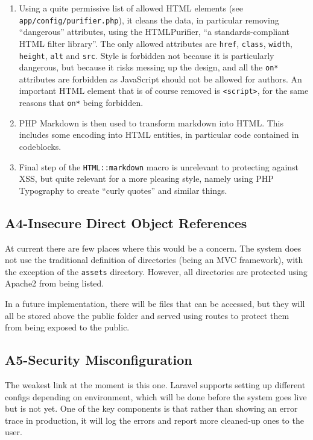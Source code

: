 \begin{enumerate}[1.]
\item
  Using a quite permissive list of allowed HTML elements (see \texttt{app/config/purifier.php}), it cleans the data, in particular removing ``dangerous'' attributes, using the HTMLPurifier, ``a standards-compliant HTML filter library''\citep{Purifier2013}. The only allowed attributes are \texttt{href}, \texttt{class}, \texttt{width}, \texttt{height}, \texttt{alt} and \texttt{src}. Style is forbidden not
  because it is particularly dangerous, but because it risks messing up the design, and all the \texttt{on*} attributes are forbidden as JavaScript should not be allowed for authors. An important HTML element that is of course removed is \texttt{\textless{}script\textgreater{}}, for the same reasons that \texttt{on*} being forbidden.
\item
  PHP Markdown is then used to transform markdown into HTML. This includes some encoding into HTML entities, in particular code contained in codeblocks.
\item
  Final step of the \texttt{HTML::markdown} macro is unrelevant to protecting against XSS, but quite relevant for a more pleasing style, namely using PHP Typography to create ``curly quotes'' and similar things.
\end{enumerate}

\subsection{A4-Insecure Direct Object References}
\noindent
At current there are few places where this would be a concern. The system does not use the traditional definition of directories (being an MVC framework), with the exception of the \texttt{assets} directory. However, all directories are protected using Apache2 from being listed.

In a future implementation, there will be files that can be accessed, but they will all be stored above the public folder and served using routes to protect them from being exposed to the public.

\subsection{A5-Security Misconfiguration}
\noindent
The weakest link at the moment is this one. Laravel supports setting up different configs depending on environment, which will be done before the system goes live but is not yet. One of the key components is that
rather than showing an error trace in production, it will log the errors and report more cleaned-up ones to the user.


